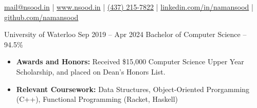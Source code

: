 \documentclass{article}
\begin{document}
    
\vspace{1mm}
{\hfill \href{mailto:mail@nsood.in}{mail@nsood.in} | 
        \href{https://www.nsood.in}{www.nsood.in} | 
        \href{tel:4372157822}{(437) 215-7822} | 
        \href{https://linkedin.com/in/namansood}{linkedin.com/in/namansood} |
        \href{https://github.com/namansood}{github.com/namansood}
\hfill}

\EducationEntry
{University of Waterloo}
{Sep 2019 -- Apr 2024}
{Bachelor of Computer Science -- 94.5\%}
{\begin{itemize} \itemsep -1pt
    \vspace{1mm}
    \item {\bf Awards and Honors:} Received \$15,000 Computer Science Upper Year Scholarship, and placed on Dean's Honors List.
    \item {\bf Relevant Coursework:} Data Structures, Object-Oriented Prorgamming (C++), Functional Programming (Racket, Haskell)
    \end{itemize}}

\normalsize
{}
\vspace{1mm} %
\end{document}
